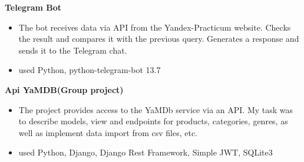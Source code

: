 \documentclass{clean_cv}
\begin{document}
   \textbf{Telegram Bot}\href{https://github.com/Chinpakamon/homework_bot}{\color{blue}}
 \begin{itemize}
   \item  The bot receives data via API from the Yandex-Practicum website. Checks the result and compares it with the previous query. Generates a response and sends it to the Telegram chat.
   \item used Python, python-telegram-bot 13.7
   \end{itemize}
   \vspace{0.5cm}

   \textbf{Api YaMDB(Group project)}\href{https://github.com/Chinpakamon/api_yamdb/tree/master}{\color{blue}}
 \begin{itemize}
   \item  The project provides access to the YaMDb service via an API. My task was to describe models, view and endpoints for products, categories, genres, as well as implement data import from csv files, etc.
   \item used Python, Django, Django Rest Framework, Simple JWT, SQLite3
   \end{itemize}
\end{document}
